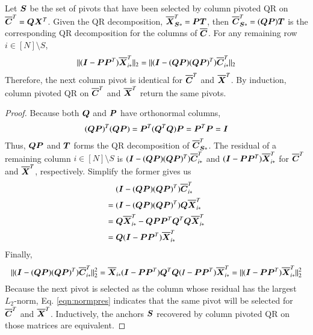 \begin{lemma}\label{lem:qrequiv}
  Let $\bm{S}$ be the set of pivots that have been selected by column pivoted QR on
  $\overline{\bm{C}}^T = \bm{Q}\bm{X}^T$. Given the QR decomposition, $\overline{\bm{X}}_{\bm{S}\ast}^T = \bm{P}
  \bm{T}$, then $\overline{\bm{C}}_{\bm{S}\ast}^T = (\bm{Q}\bm{P})\bm{T}$ is the corresponding QR
  decomposition for the columns of $\overline{\bm{C}}$. For any remaining row $i\in 
  [N]\setminus S$,
  \begin{equation}
  	\|(\bm{I}-\bm{P}\bm{P}^T)\overline{\bm{X}}_{i\ast}^T\|_2 = \|(\bm{I}-(\bm{Q}\bm{P})(\bm{Q}\bm{P})^T)\overline{\bm{C}}_
  	{i\ast}^T\|_2
  \end{equation}
  Therefore, the next column pivot is identical for $\overline{\bm{C}}^T$ and $\overline{\bm{X}}^T$. 
  By induction, column pivoted QR on $\overline{\bm{C}}^T$ and $\overline{\bm{X}}^T$ return the same
  pivots.
\end{lemma}
\begingroup
\allowdisplaybreaks
\begin{proof}
  Because both $\bm{Q}$ and $\bm{P}$ have orthonormal columns,
  \begin{equation}
    (\bm{Q}\bm{P})^T(\bm{Q}\bm{P}) = \bm{P}^T(\bm{Q}^T\bm{Q})\bm{P} = \bm{P}^T\bm{P} = \bm{I}
  \end{equation}
  Thus, $\bm{Q}\bm{P}$ and $\bm{T}$ forms the QR decomposition of $\overline{\bm{C}}_{\bm{S}\ast}^T$.
  The residual of a remaining column $i\in[N]\setminus S$ is $(\bm{I}-(\bm{Q}\bm{P})(\bm{Q}
  \bm{P})^T) \overline{\bm{C}}_{i\ast}^T$ and $(\bm{I}-\bm{P}\bm{P}^T)\overline{\bm{X}}_{i\ast}^T$ for $\overline{\bm{C}}^T$
  and $\overline{\bm{X}}^T$, respectively. Simplify the former gives us
  \begin{align*}
    &(\bm{I}-(\bm{Q}\bm{P})(\bm{Q}\bm{P})^T)\overline{\bm{C}}_{i\ast}^T \\
    ={} & (\bm{I}-(\bm{Q}\bm{P})(\bm{Q}\bm{P})^T)\bm{Q}\overline{\bm{X}}_{i\ast}^T \\
    ={} & \bm{Q}\overline{\bm{X}}_{i\ast}^T - \bm{Q}\bm{P}\bm{P}^T\bm{Q}^T\bm{Q}\overline{\bm{X}}_{i\ast}^T\\
    ={} & \bm{Q}(\bm{I}-\bm{P}\bm{P}^T)\overline{\bm{X}}_{i\ast}^T
  \end{align*}
  Finally,
  \begin{equation}\label{eqn:normpres}
    \|(\bm{I}-(\bm{Q}\bm{P})(\bm{Q}\bm{P})^T)\overline{\bm{C}}_{i\ast}^T\|_2^2 = \overline{\bm{X}}_{i\ast}
    (\bm{I}-\bm{P}\bm{P}^T) \bm{Q}^T\bm{Q}(I-\bm{P}\bm{P}^T)\overline{\bm{X}}_{i\ast}^T = \|
    (\bm{I}-\bm{P}\bm{P}^T)\overline{\bm{X}}_{i\ast}^T\|_2^2
  \end{equation}
  Because the next pivot is selected as the column whose residual has the
  largest $L_2$\hyp{}norm, Eq. \ref{eqn:normpres} indicates that the same pivot
  will be selected for $\overline{\bm{C}}^T$ and $\overline{\bm{X}}^T$. Inductively, the anchors $\bm{S}$
  recovered by column pivoted QR on those matrices are equivalent.
\end{proof}
\endgroup

